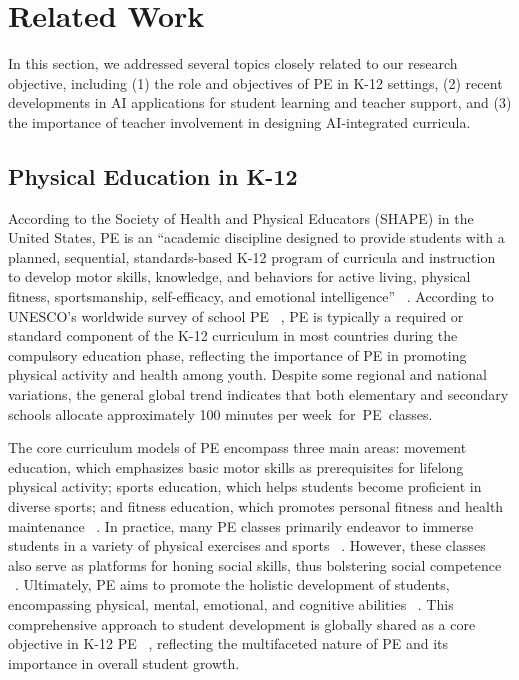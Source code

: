 \section{Related Work}
In this section, we addressed several topics closely related to our research objective, including (1) the role and objectives of PE in K-12 settings, (2) recent developments in AI applications for student learning and teacher support, and (3) the importance of teacher involvement in designing AI-integrated curricula.

\subsection{Physical Education in K-12} 
According to the Society of Health and Physical Educators (SHAPE) in the United States, PE is an ``academic discipline designed to provide students with a planned, sequential, standards-based K-12 program of curricula and instruction to develop motor skills, knowledge, and behaviors for active living, physical fitness, sportsmanship, self-efficacy, and emotional intelligence'' ~\cite{america2015essential}. According to UNESCO's worldwide survey of school PE ~\cite{hardman2014unesco}, PE is typically a required or standard component of the K-12 curriculum in most countries during the compulsory education phase, reflecting the importance of PE in promoting physical activity and health among youth. Despite some regional and national variations, the general global trend indicates that both elementary and secondary schools allocate approximately 100 minutes per week~for~PE~classes.

The core curriculum models of PE encompass three main areas: movement education, which emphasizes basic motor skills as prerequisites for lifelong physical activity; sports education, which helps students become proficient in diverse sports; and fitness education, which promotes personal fitness and health maintenance ~\cite{2013Etsb}. In practice, many PE classes primarily endeavor to immerse students in a variety of physical exercises and sports ~\cite{chen2018toward, castelli2015contextualizing, Bar1995Health}. However, these classes also serve as platforms for honing social skills, thus bolstering social competence ~\cite{pangrazi2003physical, dishman2015motivation}.
Ultimately, PE aims to promote the holistic development of students, encompassing physical, mental, emotional, and cognitive abilities ~\cite{2013Etsb}. This comprehensive approach to student development is globally shared as a core objective in K-12 PE ~\cite{lynch2019physical}, reflecting the multifaceted nature of PE and its importance in overall student growth.

